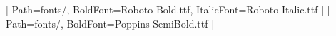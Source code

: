 \usepackage{fontspec}
\usepackage[french]{babel}
\usepackage{microtype}

\setmainfont{Roboto-Regular.ttf}[
  Path=fonts/,
  BoldFont=Roboto-Bold.ttf,
  ItalicFont=Roboto-Italic.ttf
]
\newfontfamily{}[
  Path=fonts/,
  BoldFont=Poppins-SemiBold.ttf
]
